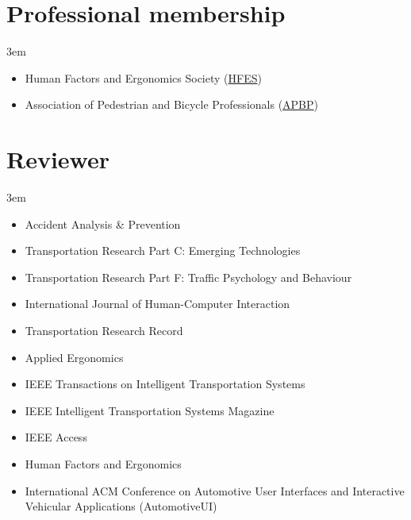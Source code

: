 \documentclass[11pt]{article}
\newenvironment{main}
{\begin{adjustwidth}{3em}{}}
{\end{adjustwidth}}
\begin{document}
\section*{Professional membership}
\begin{main}

\begin{itemize}
    \item Human Factors and Ergonomics Society (\href{https://www.hfes.org/}{HFES})
    \item Association of Pedestrian and Bicycle Professionals (\href{https://www.apbp.org/}{APBP})
\end{itemize}


\end{main}
\section*{Reviewer}
\begin{main}

\begin{itemize}
    \item Accident Analysis \& Prevention
    \item Transportation Research Part C: Emerging Technologies
    \item Transportation Research Part F: Traffic Psychology and Behaviour
    \item International Journal of Human-Computer Interaction
    \item Transportation Research Record
    \item Applied Ergonomics
    \item IEEE Transactions on Intelligent Transportation Systems 
    \item IEEE Intelligent Transportation Systems Magazine
    \item IEEE Access
    \item Human Factors and Ergonomics
    \item International ACM Conference on Automotive User Interfaces and Interactive Vehicular Applications (AutomotiveUI)
\end{itemize}


\end{main}
\end{document}
